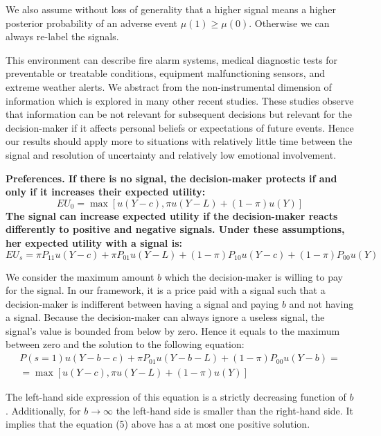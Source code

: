 \documentclass[12pt,a4paper]{article}
\begin{document}
We also assume without loss of generality that a higher signal means a higher posterior probability of an adverse event $\mu(1)\geq\mu(0)$. Otherwise we can always re-label the signals.

This environment can describe fire alarm systems, medical diagnostic tests for preventable or treatable conditions, equipment malfunctioning sensors, and extreme weather alerts. We abstract from the non-instrumental dimension of information which is explored in many other recent studies. These studies observe that information can be not relevant for subsequent decisions but relevant for the decision-maker if it affects personal beliefs or expectations of future events.  Hence our results should apply more to situations with relatively little time between the signal and resolution of uncertainty and relatively low emotional involvement.

\vspace{10pt}
\bf Preferences. \rm If there is no signal, the decision-maker protects if and only if it increases their expected utility:
\begin{equation}
EU_0=\max[u(Y-c),\pi u(Y-L)+(1-\pi) u(Y)]
\end{equation}
The signal can increase expected utility if the decision-maker reacts differently to positive and negative signals. Under these assumptions, her expected utility with a signal is:
\begin{equation}
EU_s=\pi P_{11}u(Y-c)+\pi P_{01}u(Y-L)+(1-\pi)P_{10}u(Y-c)+(1-\pi)P_{00}u(Y)
\end{equation}

We consider the maximum amount $b$ which the decision-maker is willing to pay for the signal. In our framework, it is a price paid with a signal such that a decision-maker is indifferent between having a signal and paying $b$ and not having a signal. Because the decision-maker can always ignore a useless signal, the signal's value is bounded from below by zero. Hence it equals to the maximum between zero and the solution to the following equation:
\begin{equation}
\begin{split}
P(s=1)u(Y-b-c)+\pi P_{01}u(Y-b-L)+(1-\pi)P_{00}u(Y-b)=\\=\max[u(Y-c),\pi u(Y-L)+(1-\pi) u(Y)] 
\end{split}
\end{equation}

The left-hand side expression of this equation is a strictly decreasing function of $b$. Additionally, for $b\rightarrow \infty$ the left-hand side is smaller than the right-hand side. It implies that the equation (5) above has a at most one positive solution.
\end{document}
